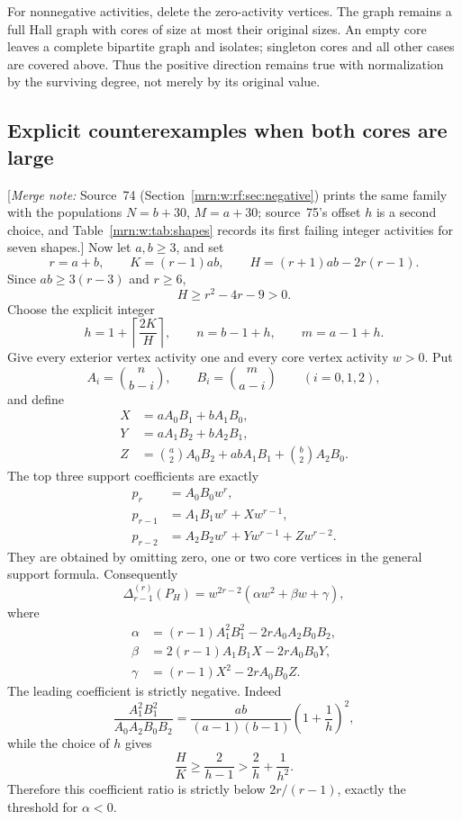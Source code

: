 \documentclass[11pt,a4paper]{article}
\theoremstyle{remark}\newtheorem{remark}[theorem]{Remark}
\newcommand{\gap}{\Delta}                  %
\newcommand{\mnote}[1]{[\textit{Merge note:} #1]}
\begin{document}
For nonnegative activities, delete the zero-activity vertices. The graph remains a full Hall graph with cores of size at most their original sizes. An empty core leaves a complete bipartite graph and isolates; singleton cores and all other cases are covered above. Thus the positive direction remains true with normalization by the surviving degree, not merely by its original value.

\subsection{Explicit counterexamples when both cores are large}\label{mrn:w:fh:sec:negative}
 \mnote{Source~74 (Section~\ref{mrn:w:rf:sec:negative}) prints the same family with the populations $N=b+30$, $M=a+30$; source~75's offset $h$ is a second choice, and Table~\ref{mrn:w:tab:shapes} records its first failing integer activities for seven shapes.}
Now let $a,b\ge3$, and set
\[
 r=a+b,\qquad K=(r-1)ab,\qquad H=(r+1)ab-2r(r-1).
\]
Since $ab\ge3(r-3)$ and $r\ge6$,
\[
 H\ge r^2-4r-9>0.
\]
Choose the explicit integer
\[
 h=1+\left\lceil\frac{2K}{H}\right\rceil,
 \qquad n=b-1+h,\qquad m=a-1+h.
\]
Give every exterior vertex activity one and every core vertex activity $w>0$. Put
\[
 A_i=\binom n{b-i},\qquad B_i=\binom m{a-i}\qquad(i=0,1,2),
\]
and define
\begin{align*}
 X&=aA_0B_1+bA_1B_0,\\
 Y&=aA_1B_2+bA_2B_1,\\
 Z&=\binom a2A_0B_2+abA_1B_1+\binom b2A_2B_0.
\end{align*}
The top three support coefficients are exactly
\begin{align*}
 p_r&=A_0B_0w^r,\\
 p_{r-1}&=A_1B_1w^r+Xw^{r-1},\\
 p_{r-2}&=A_2B_2w^r+Yw^{r-1}+Zw^{r-2}.
\end{align*}
They are obtained by omitting zero, one or two core vertices in the general support formula. Consequently
\begin{equation}\label{mrn:w:fh:eq:negativegap}
 \gap_{r-1}^{(r)}(P_H)
 =w^{2r-2}(\alpha w^2+\beta w+\gamma),
\end{equation}
where
\begin{align*}
 \alpha&=(r-1)A_1^2B_1^2-2rA_0A_2B_0B_2,\\
 \beta&=2(r-1)A_1B_1X-2rA_0B_0Y,\\
 \gamma&=(r-1)X^2-2rA_0B_0Z.
\end{align*}
The leading coefficient is strictly negative. Indeed
\[
 \frac{A_1^2B_1^2}{A_0A_2B_0B_2}
 =\frac{ab}{(a-1)(b-1)}\left(1+\frac1h\right)^2,
\]
while the choice of $h$ gives
\[
 \frac HK\ge\frac2{h-1}>\frac2h+\frac1{h^2}.
\]
Therefore this coefficient ratio is strictly below $2r/(r-1)$, exactly the threshold for $\alpha<0$.
\end{document}
